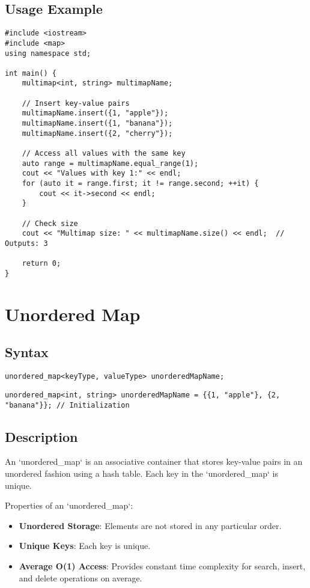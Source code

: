 \documentclass{article}
\begin{document}
\subsection{Usage Example}

\begin{lstlisting}
#include <iostream>
#include <map>
using namespace std;

int main() {
    multimap<int, string> multimapName;
    
    // Insert key-value pairs
    multimapName.insert({1, "apple"});
    multimapName.insert({1, "banana"});
    multimapName.insert({2, "cherry"});
    
    // Access all values with the same key
    auto range = multimapName.equal_range(1);
    cout << "Values with key 1:" << endl;
    for (auto it = range.first; it != range.second; ++it) {
        cout << it->second << endl;
    }
    
    // Check size
    cout << "Multimap size: " << multimapName.size() << endl;  // Outputs: 3
    
    return 0;
}
\end{lstlisting}

\newpage
\section{Unordered Map}

\subsection{Syntax}

\begin{lstlisting}
unordered_map<keyType, valueType> unorderedMapName;
\end{lstlisting}

\begin{lstlisting}
unordered_map<int, string> unorderedMapName = {{1, "apple"}, {2, "banana"}}; // Initialization
\end{lstlisting}

\subsection{Description}

An `unordered\_map` is an associative container that stores key-value pairs in an unordered fashion using a hash table. Each key in the `unordered\_map` is unique.

\noindent Properties of an `unordered\_map`:
\begin{itemize}
    \item \textbf{Unordered Storage}: Elements are not stored in any particular order.
    \item \textbf{Unique Keys}: Each key is unique.
    \item \textbf{Average O(1) Access}: Provides constant time complexity for search, insert, and delete operations on average.
\end{itemize}
\end{document}
